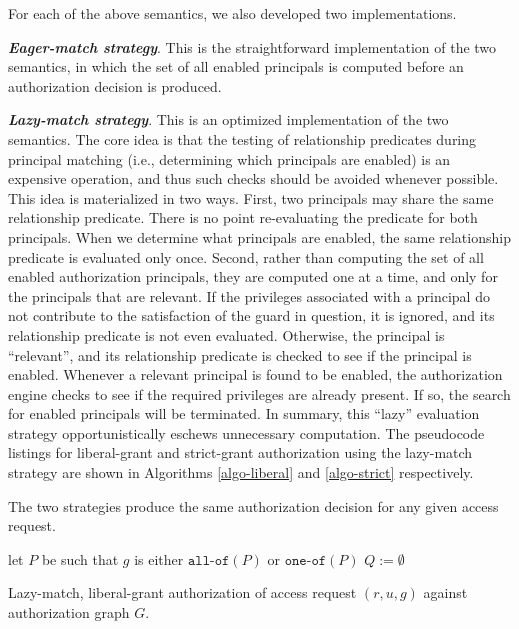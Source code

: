 \documentclass{acm_proc_article-sp}
\newcommand{\Dfn}[1]{\textbf{\emph{#1}}}
\newcommand{\textcode}[1]{\texttt{#1}}
\begin{document}
For each of the above semantics, we also developed two
implementations.
\begin{compactenum}
\item \Dfn{Eager-match strategy}.  This is the straightforward
  implementation of the two semantics, in which the set of all enabled
  principals is computed before an authorization decision is produced.
\item \Dfn{Lazy-match strategy}.  This is an optimized implementation
  of the two semantics.  The core idea is that the testing of
  relationship predicates during principal matching (i.e., determining
  which principals are enabled) is an expensive operation, and thus
  such checks should be avoided whenever possible.  This idea is
  materialized in two ways.  First, two principals may share the same
  relationship predicate.  There is no point re-evaluating the
  predicate for both principals. When we determine what principals are
  enabled, the same relationship predicate is evaluated only once.
  Second, rather than computing the set of all enabled authorization
  principals, they are computed one at a time, and only for the
  principals that are relevant.  If the privileges associated with a
  principal do not contribute to the satisfaction of the guard in
  question, it is ignored, and its relationship predicate is not even
  evaluated.  Otherwise, the principal is ``relevant'', and its
  relationship predicate is checked to see if the principal is
  enabled.  Whenever a relevant principal is found to be enabled, the
  authorization engine checks to see if the required privileges are
  already present.  If so, the search for enabled principals will be
  terminated.  In summary, this ``lazy'' evaluation strategy
  opportunistically eschews unnecessary computation.  The pseudocode
  listings for liberal-grant and strict-grant authorization using the
  lazy-match strategy are shown in Algorithms \ref{algo-liberal} and
  \ref{algo-strict} respectively.
\end{compactenum}
The two strategies produce the same authorization decision for any
given access request.



\begin{algorithm}[t]
let $P$ be such that $g$ is either $\textcode{all-of}(P)$
  or $\textcode{one-of}(P)$\;
$Q := \emptyset$\;
\;
\caption{Lazy-match, liberal-grant authorization of access request
  $(r, u, g)$ against authorization graph $G$.\label{algo-liberal}}
\end{algorithm}
\end{document}

